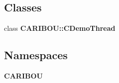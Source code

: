 \subsection*{Classes}
\begin{DoxyCompactItemize}
\item 
class {\bf C\-A\-R\-I\-B\-O\-U\-::\-C\-Demo\-Thread}
\end{DoxyCompactItemize}
\subsection*{Namespaces}
\begin{DoxyCompactItemize}
\item 
{\bf C\-A\-R\-I\-B\-O\-U}
\end{DoxyCompactItemize}
